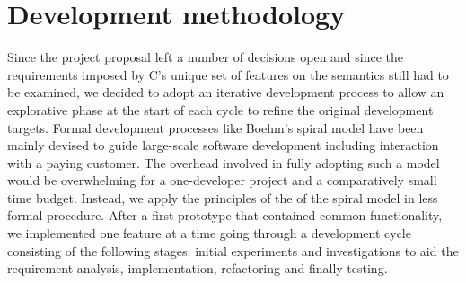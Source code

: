\documentclass[a4paper,12pt]{scrbook}
\theoremstyle{plain}
\theoremstyle{definition}
\begin{document}



\section{Development methodology}
Since the project proposal left a number of decisions open and since the
requirements imposed by C's unique set of features on the semantics still had to
be examined, we decided to adopt an iterative development process to allow an
explorative phase at the start of each cycle to refine the original development
targets. Formal development processes like Boehm's spiral model
\cite{spiralModel} have been mainly devised to guide large-scale software
development including interaction with a paying customer. The overhead involved
in fully adopting such a model would be overwhelming for a one-developer project
and a comparatively small time budget. Instead, we apply the principles of the
 \cite[p. 61]{spiralModel} of the
spiral model in less formal procedure. After a first prototype that contained
common functionality, we implemented one feature at a time going through a
development cycle consisting of the following stages: initial experiments and
investigations to aid the requirement analysis, implementation, refactoring and
finally testing.
\end{document}
